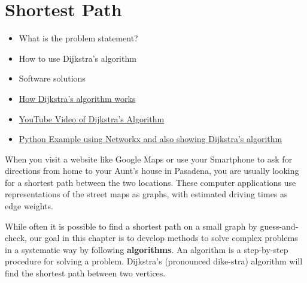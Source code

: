 \section{Shortest Path}
\label{sec:gt-shortest-path}
\begin{outcome}
\begin{itemize}
\item What is the problem statement?
\item How to use Dijkstra's algorithm
\item Software solutions
\end{itemize}
\end{outcome}
\begin{resource}
\begin{itemize}
\item \href{https://www.youtube.com/watch?v=EFg3u_E6eHU&ab_channel=SpanningTree}{How Dijkstra's algorithm works}
\item \href{https://youtu.be/EFg3u_E6eHU}{YouTube Video of Dijkstra's Algorithm}
\item \href{https://github.com/open-optimization/open-optimization-or-book/blob/master/instructive-code/networkx%20example%20-%20Dijkstra's%20Algorithm.ipynb}{Python Example using Networkx and also showing Dijkstra's algorithm}
\end{itemize}
\end{resource}
When you visit a website like Google Maps or use your Smartphone to ask for directions from home to your Aunt's house in Pasadena, you are usually looking for a shortest path between the two locations.  These computer applications use representations of the street maps as graphs, with estimated driving times as edge weights.

While often it is possible to find a shortest path on a small graph by guess-and-check, our goal in this chapter is to develop methods to solve complex problems in a systematic way by following \textbf{algorithms}.  An algorithm is a step-by-step procedure for solving a problem.  Dijkstra's (pronounced dike-stra) algorithm will find the shortest path between two vertices.

